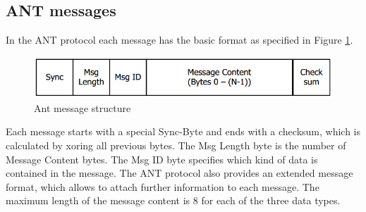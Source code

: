 \subsection{ANT messages}
In the ANT protocol each message has the basic format as specified in Figure \ref{fig:antmsg}.
\begin{figure}[h]
	\centering
	\includegraphics[scale=.75]{content/images/ANTmsg.png}
	\caption{Ant message structure\cite{DynastreamInnovationsInc.2013}}\label{fig:antmsg}
\end{figure}
Each message starts with a special Sync-Byte and ends with a checksum, which is calculated by xoring all previous bytes. The Msg Length byte is the number of Message Content bytes. The Msg ID byte specifies which kind of data is contained in the message. The ANT protocol also provides an extended message format, which allows to attach further information to each message. The maximum length of the message content is 8 for each of the three data types.